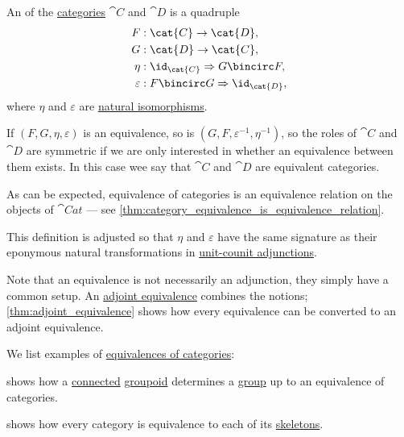 \begin{definition}\label{def:equivalence_of_categories}
  An  of the \hyperref[def:category]{categories} \( \cat{C} \) and \( \cat{D} \) is a quadruple
  \begin{equation*}
    \begin{aligned}
                F &: \cat{C} \to \cat{D}, \\
                G &: \cat{D} \to \cat{C}, \\
             \eta &: \id_{\cat{C}} \Rightarrow G \bincirc F, \\
      \varepsilon &: F \bincirc G \Rightarrow \id_{\cat{D}},
    \end{aligned}
  \end{equation*}
  where \( \eta \) and \( \varepsilon \) are \hyperref[thm:natural_isomorphism]{natural isomorphisms}.

  If \( (F, G, \eta, \varepsilon) \) is an equivalence, so is \( (G, F, \varepsilon^{-1}, \eta^{-1}) \), so the roles of \( \cat{C} \) and \( \cat{D} \) are symmetric if we are only interested in whether an equivalence between them exists. In this case wee say that \( \cat{C} \) and \( \cat{D} \) are equivalent categories.
\end{definition}
\begin{comments}
  \item As can be expected, equivalence of categories is an equivalence relation on the objects of \( \cat{Cat} \) --- see \cref{thm:category_equivalence_is_equivalence_relation}.

  \item This definition is adjusted so that \( \eta \) and \( \varepsilon \) have the same signature as their eponymous natural transformations in \hyperref[def:unit_counit_adjunction]{unit-counit adjunctions}.

  Note that an equivalence is not necessarily an adjunction, they simply have a common setup. An \hyperref[def:adjoint_equivalence]{adjoint equivalence} combines the notions; \cref{thm:adjoint_equivalence} shows how every equivalence can be converted to an adjoint equivalence.
\end{comments}

\begin{example}\label{ex:def:equivalence_of_categories}
  We list examples of \hyperref[def:equivalence_of_categories]{equivalences of categories}:
  \begin{thmenum}
      shows how a \hyperref[def:connected_category]{connected} \hyperref[def:groupoid]{groupoid} determines a \hyperref[def:group]{group} up to an equivalence of categories.

      shows how every category is equivalence to each of its \hyperref[def:category_skeleton]{skeletons}.
  \end{thmenum}
\end{example}


